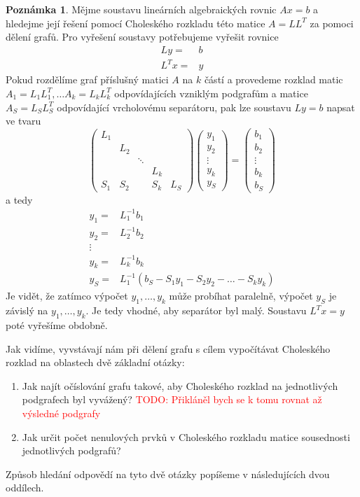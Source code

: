 \documentclass[11pt,american,czech,oneside]{book}
\theoremstyle{plain}
\theoremstyle{definition}
\newtheorem{remark}{Poznámka}
\newcommand{\TODO}[1]{\textcolor{red}{TODO: #1}}
\begin{document}
\begin{remark}
Mějme soustavu lineárních algebraických rovnic $Ax=b$ a hledejme její řešení pomocí Choleského rozkladu této matice $A=LL^T$ za pomoci dělení grafů. Pro vyřešení soustavy potřebujeme vyřešit rovnice
\begin{align*}
  Ly =& b \\
  L^Tx= & y
\end{align*}
Pokud rozdělíme graf příslušný matici $A$ na $k$ částí a provedeme rozklad matic $A_1=L_1 L_1^T, \ldots A_k=L_k L_k^T$ odpovídajících vzniklým podgrafům a matice $A_S=L_S L_S^T$ odpovídající vrcholovému separátoru, pak lze soustavu $Ly=b$ napsat ve tvaru
\[
\begin{pmatrix}
  L_1 &     &        &      & \\
      & L_2 &        &      & \\
      &     & \ddots &      & \\
      &     &        & L_k  & \\
  S_1 & S_2 &        & S_k  & L_S
\end{pmatrix}
\begin{pmatrix}
  y_1 \\
  y_2 \\
  \vdots \\
  y_k \\
  y_S
\end{pmatrix}
=
\begin{pmatrix}
  b_1 \\
  b_2 \\
  \vdots \\
  b_k \\
  b_S
\end{pmatrix}
\]
a tedy
\begin{align*}
  y_1= & L_1^{-1}b_1 \\
  y_2= & L_2^{-1}b_2 \\
  \vdots \\
  y_k= & L_k^{-1}b_k \\
  y_S= & L_1^{-1}(b_S - S_1 y_1 - S_2 y_2 - \ldots - S_k y_k)
\end{align*}
Je vidět, že zatímco výpočet $y_1, \ldots, y_k$ může probíhat paralelně, výpočet $y_S$ je závislý na $y_1, \ldots, y_k$. Je tedy vhodné, aby separátor byl malý.
Soustavu $L^Tx=y$ poté vyřešíme obdobně.
\end{remark}

\medskip
Jak vidíme, vyvstávají nám při dělení grafu s cílem vypočítávat Choleského rozklad na oblastech dvě základní otázky:
\begin{enumerate}
  \item Jak najít očíslování grafu takové, aby Choleského rozklad na jednotlivých podgrafech byl vyvážený? \TODO{Přikláněl bych se k tomu rovnat až výsledné podgrafy}
  \item Jak určit počet nenulových prvků v Choleského rozkladu matice sousednosti jednotlivých podgrafů?
\end{enumerate}
Způsob hledání odpovědí na tyto dvě otázky popíšeme v následujících dvou oddílech.
\end{document}
